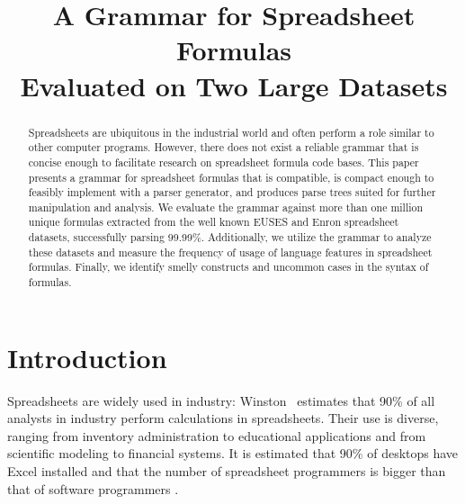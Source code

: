 \documentclass[conference]{IEEEtran}
\begin{document}
\title{A Grammar for Spreadsheet Formulas\\Evaluated on Two Large Datasets}

\author{
}
\maketitle

\begin{abstract}
Spreadsheets are ubiquitous in the industrial world and often perform a role similar to other computer programs.
However, there does not exist a reliable grammar that is concise enough to facilitate research on spreadsheet formula code bases.
This paper presents a grammar for spreadsheet formulas that is compatible, is compact enough to feasibly implement with a parser generator, and produces parse trees suited for further manipulation and analysis. 
We evaluate the grammar against more than one million unique formulas extracted from the well known EUSES and Enron spreadsheet datasets, successfully parsing 99.99\%.
Additionally, we utilize the grammar to analyze these datasets and measure the frequency of usage of language features in spreadsheet formulas.
Finally, we identify smelly constructs and uncommon cases in the syntax of formulas.
\end{abstract}

\IEEEpeerreviewmaketitle

\section{Introduction}
Spreadsheets are widely used in industry: Winston~\cite{Wins2001} estimates that 90\% of all analysts in industry perform calculations in
spreadsheets. Their use is diverse, ranging from inventory administration to educational applications and from scientific
modeling to financial systems. It is estimated that 90\% of desktops have Excel installed \cite{DBLP:conf/icse/BradleyM09} and that the number of spreadsheet programmers is bigger than that of software programmers \cite{DBLP:conf/vl/ScaffidiSM05}. 
\end{document}
